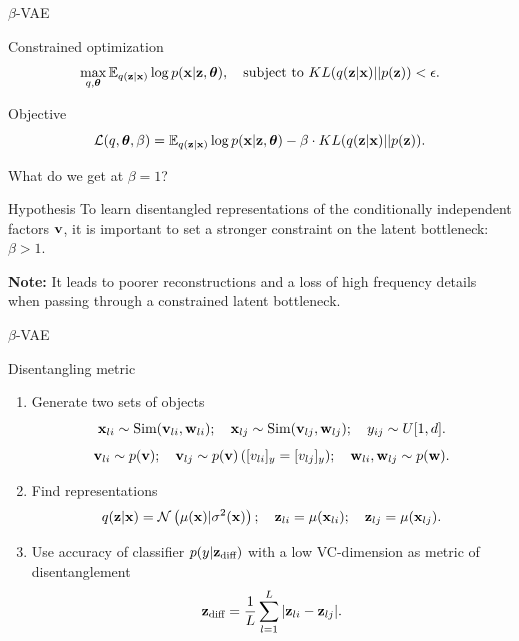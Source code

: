 \begin{frame}{$\beta$-VAE}
	\vspace{-0.5cm}
	\begin{block}{Constrained optimization}
	\vspace{-0.5cm}
	\[
	    \max_{q, \boldsymbol{\theta}} \mathbb{E}_{q(\mathbf{z} | \mathbf{x})} \log p(\mathbf{x} | \mathbf{z}, \boldsymbol{\theta}), \quad \text{subject to } KL (q(\mathbf{z} | \mathbf{x}) || p(\mathbf{z})) < \epsilon.
	\]
	\vspace{-0.7cm}
	\end{block}
	\begin{block}{Objective}
	\vspace{-0.5cm}
	\[
	    \mathcal{L}(q, \boldsymbol{\theta}, \beta) = \mathbb{E}_{q(\mathbf{z} | \mathbf{x})} \log p(\mathbf{x} | \mathbf{z}, \boldsymbol{\theta}) - \beta \cdot KL (q(\mathbf{z} | \mathbf{x}) || p(\mathbf{z})).
	\]
	\vspace{-0.5cm}
	\end{block}
	What do we get at $\beta = 1$? \\
	\begin{block}{Hypothesis}
	To learn disentangled representations of the conditionally independent factors $\mathbf{v}$, it is important to set a stronger constraint on the latent bottleneck: $\beta > 1$.
	\end{block}
	\textbf{Note:} It leads to poorer reconstructions and a loss of high frequency details when passing through a constrained latent bottleneck. 
\end{frame}
\begin{frame}{$\beta$-VAE}
	\begin{block}{Disentangling metric}
		\begin{enumerate}
			\item Generate two sets of objects
			\[
			\mathbf{x}_{li} \sim \text{Sim}(\mathbf{v}_{li}, \mathbf{w}_{li}); \quad \mathbf{x}_{lj} \sim \text{Sim}(\mathbf{v}_{lj}, \mathbf{w}_{lj}); \quad y_{ij} \sim U[1, d].
			\]
			\[
			\mathbf{v}_{li} \sim p(\mathbf{v}); \quad \mathbf{v}_{lj} \sim p(\mathbf{v}) \, ([v_{li}]_y = [v_{lj}]_y); \quad \mathbf{w}_{li}, \mathbf{w}_{lj} \sim p(\mathbf{w}).
			\]
			\item Find representations
			\[
			q(\mathbf{z} | \mathbf{x}) = \mathcal{N}\left(\mu(\mathbf{x}) | \sigma^2(\mathbf{x})\right); \quad \mathbf{z}_{li} = \mu(\mathbf{x}_{li}); \quad \mathbf{z}_{lj} = \mu(\mathbf{x}_{lj}).
			\]
			\item Use accuracy of classifier $p(y | \mathbf{z}_{\text{diff}})$ with a low VC-dimension as metric of disentanglement
			\[
			\mathbf{z}_{\text{diff}} = \frac{1}{L} \sum_{l=1}^L | \mathbf{z}_{li} - \mathbf{z}_{lj} |.
			\]
		\end{enumerate}
	
	\end{block}
\end{frame}
